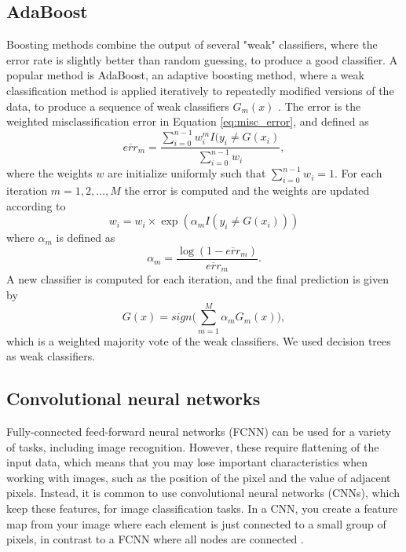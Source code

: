 \subsection{AdaBoost}\label{ssec:adaboost}
Boosting methods combine the output of several "weak" classifiers, where the error rate is slightly better than random guessing, to produce a good classifier. A popular method is AdaBoost, an adaptive boosting method, where a weak classification method is applied iteratively to repeatedly modified versions of the data, to produce a sequence of weak classifiers $G_{m}(x)$ \cite[p. 337]{hastie:2009:elements}. The error is  the weighted misclassification error in Equation \eqref{eq:misc_error}, and defined as
\begin{equation}
    \overline{err}_{m} = \frac{\sum_{i=0}^{n-1} w_{i}^{m} I(y_{i} \neq G(x_{i})}{\sum_{i=0}^{n-1} w_{i}} ,
\end{equation}
where the weights $w$ are initialize uniformly such that  $\sum_{i=0}^{n-1} w_{i} = 1$. For each iteration $m = 1, 2, \dots, M$ the error is computed and the weights are updated according to 
\begin{equation}
    w_{i} = w_{i} \times \exp (\alpha_{m} I(y_{i} \neq G(x_{i})))
\end{equation}
where $\alpha_{m}$ is defined as 
\begin{equation}
    \alpha_{m} = \frac{\log (1 - \overline{err}_{m})}{\overline{err}_{m}} .
\end{equation}
A new classifier is computed for each iteration, and the final prediction is given by 
\begin{equation}
    G(x) = sign \bigg( \sum_{m=1}^{M} \alpha_{m} G_{m}(x) \bigg) ,
\end{equation}
which is a weighted majority vote of the weak classifiers. We used decision trees as weak classifiers. 


\subsection{Convolutional neural networks}

Fully-connected feed-forward neural networks (FCNN) can be used for a variety of tasks, including image recognition. However, these require flattening of the input data, which means that you may lose important characteristics when working with images, such as the position of the pixel and the value of adjacent pixels. Instead, it is common to use convolutional neural networks (CNNs), which keep these features, for image classification tasks. In a CNN, you create a feature map from your image where each element is just connected to a small group of pixels, in contrast to a FCNN where all nodes are connected \cite{raschka:2022:ml_pytorch_scikit}.

